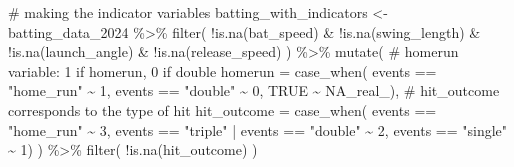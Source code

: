 \documentclass[
  letterpaper,
  DIV=11,
  numbers=noendperiod]{scrartcl}
\newenvironment{Shaded}{\begin{snugshade}}{\end{snugshade}}
\newcommand{\AttributeTok}[1]{\textcolor[rgb]{0.40,0.45,0.13}{#1}}
\newcommand{\CommentTok}[1]{\textcolor[rgb]{0.37,0.37,0.37}{#1}}
\newcommand{\ConstantTok}[1]{\textcolor[rgb]{0.56,0.35,0.01}{#1}}
\newcommand{\DecValTok}[1]{\textcolor[rgb]{0.68,0.00,0.00}{#1}}
\newcommand{\FunctionTok}[1]{\textcolor[rgb]{0.28,0.35,0.67}{#1}}
\newcommand{\NormalTok}[1]{\textcolor[rgb]{0.00,0.23,0.31}{#1}}
\newcommand{\OtherTok}[1]{\textcolor[rgb]{0.00,0.23,0.31}{#1}}
\newcommand{\SpecialCharTok}[1]{\textcolor[rgb]{0.37,0.37,0.37}{#1}}
\newcommand{\StringTok}[1]{\textcolor[rgb]{0.13,0.47,0.30}{#1}}
\begin{document}
\begin{Shaded}
\begin{Highlighting}[]
\CommentTok{\# making the indicator variables  }
\NormalTok{batting\_with\_indicators }\OtherTok{\textless{}{-}}\NormalTok{ batting\_data\_2024 }\SpecialCharTok{\%\textgreater{}\%} 
  \FunctionTok{filter}\NormalTok{(}
    \SpecialCharTok{!}\FunctionTok{is.na}\NormalTok{(bat\_speed) }\SpecialCharTok{\&}
      \SpecialCharTok{!}\FunctionTok{is.na}\NormalTok{(swing\_length) }\SpecialCharTok{\&}
      \SpecialCharTok{!}\FunctionTok{is.na}\NormalTok{(launch\_angle) }\SpecialCharTok{\&}
      \SpecialCharTok{!}\FunctionTok{is.na}\NormalTok{(release\_speed)}
\NormalTok{    ) }\SpecialCharTok{\%\textgreater{}\%}
  \FunctionTok{mutate}\NormalTok{(}
    \CommentTok{\# homerun variable: 1 if homerun, 0 if double }
    \AttributeTok{homerun =} \FunctionTok{case\_when}\NormalTok{(}
\NormalTok{      events }\SpecialCharTok{==} \StringTok{"home\_run"} \SpecialCharTok{\textasciitilde{}} \DecValTok{1}\NormalTok{,}
\NormalTok{      events }\SpecialCharTok{==} \StringTok{"double"} \SpecialCharTok{\textasciitilde{}} \DecValTok{0}\NormalTok{,}
      \ConstantTok{TRUE} \SpecialCharTok{\textasciitilde{}} \ConstantTok{NA\_real\_}\NormalTok{),}
    \CommentTok{\# hit\_outcome corresponds to the type of hit }
    \AttributeTok{hit\_outcome =} \FunctionTok{case\_when}\NormalTok{(}
\NormalTok{      events }\SpecialCharTok{==} \StringTok{"home\_run"} \SpecialCharTok{\textasciitilde{}} \DecValTok{3}\NormalTok{,}
\NormalTok{      events }\SpecialCharTok{==} \StringTok{"triple"} \SpecialCharTok{|}\NormalTok{ events }\SpecialCharTok{==} \StringTok{"double"} \SpecialCharTok{\textasciitilde{}} \DecValTok{2}\NormalTok{,}
\NormalTok{      events }\SpecialCharTok{==} \StringTok{"single"} \SpecialCharTok{\textasciitilde{}} \DecValTok{1}\NormalTok{)}
\NormalTok{    ) }\SpecialCharTok{\%\textgreater{}\%} \FunctionTok{filter}\NormalTok{(}
      \SpecialCharTok{!}\FunctionTok{is.na}\NormalTok{(hit\_outcome)}
\NormalTok{      )}
\end{Highlighting}
\end{Shaded}

\begin{table}

\caption{\label{tbl-indicator-variables}Description of Indicator
Variables Used}


\end{table}%
\end{document}
